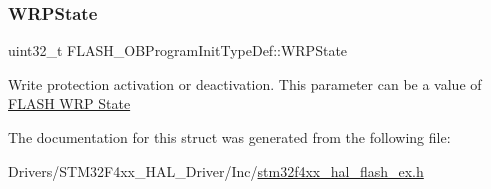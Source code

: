 \subsubsection{\texorpdfstring{W\+R\+P\+State}{WRPState}}
{\footnotesize\ttfamily uint32\+\_\+t F\+L\+A\+S\+H\+\_\+\+O\+B\+Program\+Init\+Type\+Def\+::\+W\+R\+P\+State}

Write protection activation or deactivation. This parameter can be a value of \hyperlink{group___f_l_a_s_h_ex___w_r_p___state}{F\+L\+A\+SH W\+RP State} 

The documentation for this struct was generated from the following file\+:\begin{DoxyCompactItemize}
\item 
Drivers/\+S\+T\+M32\+F4xx\+\_\+\+H\+A\+L\+\_\+\+Driver/\+Inc/\hyperlink{stm32f4xx__hal__flash__ex_8h}{stm32f4xx\+\_\+hal\+\_\+flash\+\_\+ex.\+h}\end{DoxyCompactItemize}
